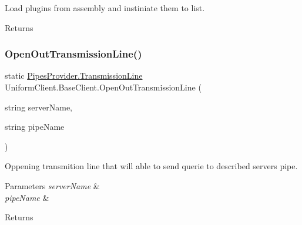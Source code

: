 Load plugins from assembly and instiniate them to list. 

\begin{DoxyReturn}{Returns}

\end{DoxyReturn}
\mbox{\label{class_uniform_client_1_1_base_client_aaeab527820b088ab3a84cd210e53a01f}} 
\subsubsection{\texorpdfstring{Open\+Out\+Transmission\+Line()}{OpenOutTransmissionLine()}}
{\footnotesize\ttfamily static \mbox{\hyperlink{class_pipes_provider_1_1_transmission_line}{Pipes\+Provider.\+Transmission\+Line}} Uniform\+Client.\+Base\+Client.\+Open\+Out\+Transmission\+Line (\begin{DoxyParamCaption}\item[{string}]{server\+Name,  }\item[{string}]{pipe\+Name }\end{DoxyParamCaption})\hspace{0.3cm}{\ttfamily [static]}}



Oppening transmition line that will able to send querie to described server\textquotesingle{}s pipe. 


\begin{DoxyParams}{Parameters}
{\em server\+Name} & \\
\hline
{\em pipe\+Name} & \\
\hline
\end{DoxyParams}
\begin{DoxyReturn}{Returns}

\end{DoxyReturn}
\mbox{\label{class_uniform_client_1_1_base_client_a9044693efc8f4ccf259e954c5345236f}} 
